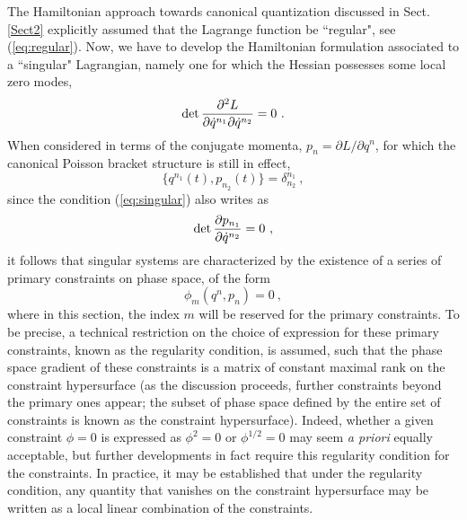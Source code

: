 \documentclass[a4paper,11pt]{article}
\begin{document}
The Hamiltonian approach towards canonical quantization discussed in
Sect.\ref{Sect2} explicitly assumed that the Lagrange function be
``regular", see (\ref{eq:regular}). Now, we have to develop the
Hamiltonian formulation associated to a ``singular" Lagrangian,\cite{Dirac,JG1}
namely one for which the Hessian possesses some local zero modes,
\begin{equation}
{\rm det}\,\frac{\partial^2 L}{\partial\dot{q}^{n_1}\partial\dot{q}^{n_2}}=0\ .
\label{eq:singular}
\end{equation}
When considered in terms of the conjugate momenta, 
$p_n=\partial L/\partial q^n$, for which the canonical Poisson bracket
structure is still in effect,
\begin{equation}
\{q^{n_1}(t),p_{n_2}(t)\}=\delta^{n_1}_{n_2}\ ,
\end{equation}
since the condition (\ref{eq:singular}) also writes as
\begin{equation}
{\rm det}\,\frac{\partial p_{n_1}}{\partial\dot{q}^{n_2}}=0\ ,
\end{equation}
it follows that singular systems are characterized by the existence of
a series of primary constraints on phase space, of the form
\begin{equation}
\phi_m(q^n,p_n)=0\ ,
\end{equation}
where in this section, the index $m$ will be reserved for the primary
constraints. To be precise, a technical restriction on the choice of
expression for these primary constraints, known as the regularity condition,
is assumed, such that the phase space gradient of these constraints is a 
matrix of constant maximal rank on the constraint hypersurface (as the 
discussion proceeds, further constraints beyond the primary ones appear; 
the subset of phase space defined by the entire set of constraints is known 
as the constraint hypersurface). Indeed, whether a given constraint 
$\phi=0$ is expressed as $\phi^2=0$ or $\phi^{1/2}=0$ may 
seem {\sl a priori\/} equally acceptable, but further developments in fact 
require this re\-gu\-la\-ri\-ty condition for the constraints. In practice, 
it may be established that under the regularity condition, any quantity that
vanishes on the constraint hypersurface may be written as a local
linear combination of the constraints.
\end{document}
